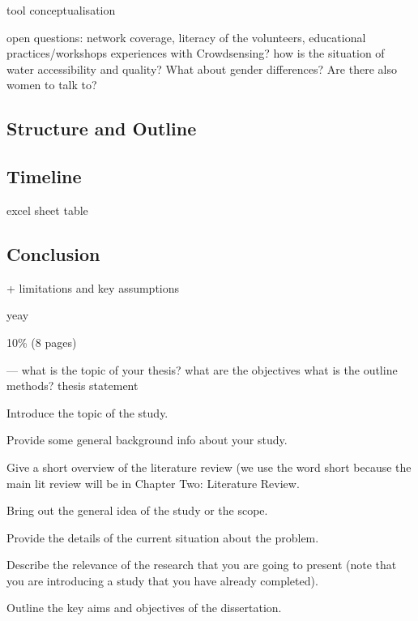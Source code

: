 tool conceptualisation



open questions: network coverage, literacy of the volunteers, educational practices/workshops
experiences with Crowdsensing?
how is the situation of water accessibility and quality?
What about gender differences?
Are there also women to talk to?



\subsection{Structure and Outline}


\subsection{Timeline}
excel sheet table


\subsection{Conclusion}

+ limitations and key assumptions

yeay

10\% (8 pages)

---
what is the topic of your thesis?
what are the objectives
what is the outline
methods?
thesis statement

Introduce the topic of the study.

Provide some general background info about your study.

Give a short overview of the literature review (we use the word short because the main lit review will be in Chapter Two: Literature Review.

Bring out the general idea of the study or the scope.

Provide the details of the current situation about the problem.

Describe the relevance of the research that you are going to present (note that you are introducing a study that you have already completed).

Outline the key aims and objectives of the dissertation.

